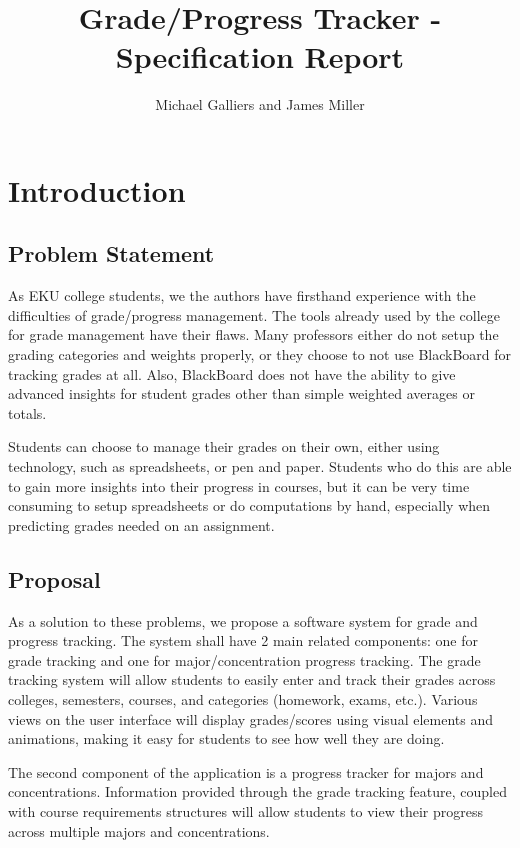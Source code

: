 \documentclass[12pt]{article}
\author{Michael Galliers and James Miller}
\title{Grade/Progress Tracker - Specification Report}
\begin{document}
\begin{titlepage}
\maketitle
\end{titlepage}

\newpage
    \tableofcontents
\newpage

\thispagestyle{empty}
\listoffigures
\newpage

\section{Introduction}
\subsection{Problem Statement}
As EKU college students, we the authors have firsthand experience with the difficulties of
grade/progress management. The tools already used by the college for grade management have their
flaws. Many professors either do not setup the grading categories and weights properly, or they
choose to not use BlackBoard for tracking grades at all. Also, BlackBoard does not have the ability
to give advanced insights for student grades other than simple weighted averages or totals.

Students can choose to manage their grades on their own, either using technology, such as
spreadsheets, or pen and paper. Students who do this are able to gain more insights into their
progress in courses, but it can be very time consuming to setup spreadsheets or do computations by
hand, especially when predicting grades needed on an assignment.

\subsection{Proposal}
As a solution to these problems, we propose a software system for grade and progress tracking. The
system shall have 2 main related components: one for grade tracking and one for major/concentration
progress tracking. The grade tracking system will allow students to easily enter and track their
grades across colleges, semesters, courses, and categories (homework, exams, etc.). Various views on
the user interface will display grades/scores using visual elements and animations, making it easy
for students to see how well they are doing.

The second component of the application is a progress tracker for majors and concentrations.
Information provided through the grade tracking feature, coupled with course requirements structures
will allow students to view their progress across multiple majors and concentrations.
\end{document}
